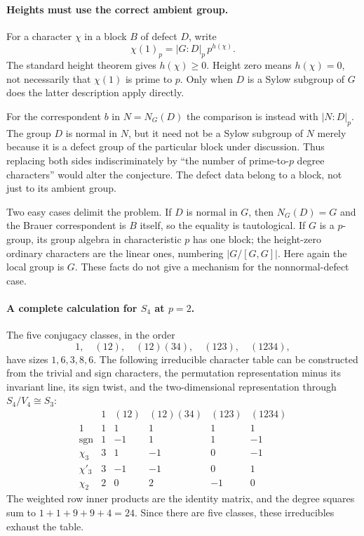 \documentclass[11pt]{article}
\begin{document}
\paragraph{Heights must use the correct ambient group.}
For a character $\chi$ in a block $B$ of defect $D$, write
\[
 \chi(1)_p=|G:D|_p\,p^{h(\chi)}.
\]
The standard height theorem gives $h(\chi)\ge0$. Height zero means $h(\chi)=0$, not necessarily that $\chi(1)$ is prime to $p$. Only when $D$ is a Sylow subgroup of $G$ does the latter description apply directly.

For the correspondent $b$ in $N=N_G(D)$ the comparison is instead with $|N:D|_p$. The group $D$ is normal in $N$, but it need not be a Sylow subgroup of $N$ merely because it is a defect group of the particular block under discussion. Thus replacing both sides indiscriminately by ``the number of prime-to-$p$ degree characters'' would alter the conjecture. The defect data belong to a block, not just to its ambient group.

Two easy cases delimit the problem. If $D$ is normal in $G$, then $N_G(D)=G$ and the Brauer correspondent is $B$ itself, so the equality is tautological. If $G$ is a $p$-group, its group algebra in characteristic $p$ has one block; the height-zero ordinary characters are the linear ones, numbering $|G/[G,G]|$. Here again the local group is $G$. These facts do not give a mechanism for the nonnormal-defect case.

\paragraph{A complete calculation for $S_4$ at $p=2$.}
The five conjugacy classes, in the order
\[
 1,\quad(12),\quad(12)(34),\quad(123),\quad(1234),
\]
have sizes $1,6,3,8,6$. The following irreducible character table can be constructed from the trivial and sign characters, the permutation representation minus its invariant line, its sign twist, and the two-dimensional representation through $S_4/V_4\cong S_3$:
\[
\begin{array}{c|rrrrr}
 &1&(12)&(12)(34)&(123)&(1234)\\\hline
 1&1&1&1&1&1\\
 \mathrm{sgn}&1&-1&1&1&-1\\
 \chi_3&3&1&-1&0&-1\\
 \chi'_3&3&-1&-1&0&1\\
 \chi_2&2&0&2&-1&0
\end{array}                                                    \tag{1}
\]
The weighted row inner products are the identity matrix, and the degree squares sum to $1+1+9+9+4=24$. Since there are five classes, these irreducibles exhaust the table.
\end{document}
